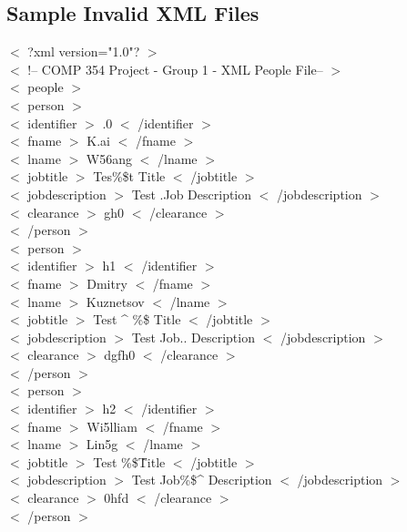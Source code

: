 \documentclass[12pt]{article}
\newcommand{\tab}{\hspace*{2em}}
\begin{document}
\subsection{Sample Invalid XML Files}
{

 $<$ ?xml version="1.0"? $>$ 
\\ $<$ !-- COMP 354 Project - Group 1 - XML People File-- $>$ 
\\ $<$ people $>$ 
\\ \tab$<$ person $>$ 
\\ \tab\tab $<$ identifier $>$ .0 $<$ /identifier $>$ 
\\ \tab\tab $<$ fname $>$ K.ai $<$ /fname $>$ 
\\ \tab\tab $<$ lname $>$ W56ang $<$ /lname $>$ 
\\ \tab\tab $<$ jobtitle $>$  Tes\%\$t Title $<$ /jobtitle $>$ 
\\ \tab\tab $<$ jobdescription $>$ Test .Job Description $<$ /jobdescription $>$ 
\\ \tab\tab $<$ clearance $>$ gh0 $<$ /clearance $>$ 
\\ \tab$<$ /person $>$ 
\\ \tab$<$ person $>$ 
\\ \tab\tab $<$ identifier $>$ h1 $<$ /identifier $>$ 
\\ \tab\tab $<$ fname $>$ Dmitry $<$ /fname $>$ 
\\ \tab\tab $<$ lname $>$ Kuznetsov $<$ /lname $>$ 
\\ \tab\tab $<$ jobtitle $>$ Test \^{} \%\$ Title $<$ /jobtitle $>$ 
\\ \tab\tab $<$ jobdescription $>$ Test Job.. Description $<$ /jobdescription $>$ 
\\ \tab\tab $<$ clearance $>$ dgfh0 $<$ /clearance $>$ 
\\ \tab$<$ /person $>$ 
\\ \tab$<$ person $>$ 
\\ \tab\tab $<$ identifier $>$ h2 $<$ /identifier $>$ 
\\ \tab\tab $<$ fname $>$ Wi5lliam $<$ /fname $>$ 
\\ \tab\tab $<$ lname $>$ Lin5g $<$ /lname $>$ 
\\ \tab\tab $<$ jobtitle $>$ Test \%\$\^Title $<$ /jobtitle $>$ 
\\ \tab\tab $<$ jobdescription $>$ Test Job\%\$\^{} Description $<$ /jobdescription $>$ 
\\ \tab\tab $<$ clearance $>$ 0hfd $<$ /clearance $>$ 
\\ \tab$<$ /person $>$ 
}
\end{document}

